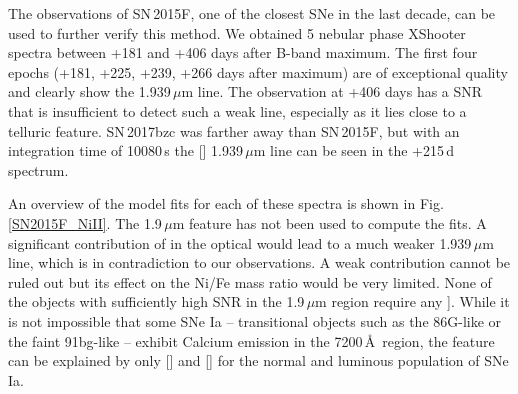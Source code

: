 \documentclass[fleqn,usenatbib]{mnras}
\begin{document}
The observations of SN\,2015F, one of the closest SNe in the last decade, can be used to further verify this method. We obtained 5 nebular phase XShooter spectra between +181 and +406 days after B-band maximum. The first four epochs (+181, +225, +239, +266 days after maximum) are of exceptional quality and clearly show the 1.939\,$\mu$m line. The observation at +406 days has a SNR that is insufficient to detect such a weak line, especially as it lies close to a telluric feature. SN\,2017bzc was farther away than SN\,2015F, but with an integration time of 10080\,s the [] 1.939\,$\mu$m line can be seen in the +215\,d spectrum.

An overview of the model fits for each of these spectra is shown in Fig. \ref{SN2015F_NiII}. The 1.9\,$\mu$m feature has not been used to compute the fits. A significant contribution of  in the optical would lead to a much weaker 1.939\,$\mu$m line, which is in contradiction to our observations. A weak  contribution cannot be ruled out but its effect on the Ni/Fe mass ratio would be very limited. None of the objects with sufficiently high SNR in the 1.9\,$\mu$m region require any ]. While it is not impossible that some SNe Ia -- transitional objects such as the 86G-like or the faint 91bg-like -- exhibit Calcium emission in the 7200\,\AA\, region, the feature can be explained by only [] and [] for the normal and luminous population of SNe Ia.
\end{document}
